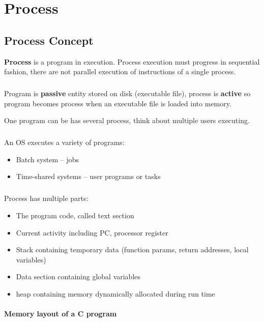 \chapter{Process}

\section{Process Concept}

\textbf{Process} is a program in execution. Process execution must progress in sequential fashion, there are not parallel execution of instructions of a single process. 
\paragraph{}
Program is \textbf{passive} entity stored on disk (executable file), process is \textbf{active} so program becomes process when an executable file is loaded into memory.

One program can be has several process, think about multiple users executing.

\paragraph{}
An OS executes a variety of programs:
\begin{itemize}
    \item Batch system – jobs
    \item Time-shared systems – user programs or tasks
\end{itemize}

\paragraph{}
Process has multiple parts:
\begin{itemize}
    \item The program code, called text section
    \item Current activity including PC, processor register
    \item Stack containing temporary data (function params, return addresses, local variables)
    \item Data section containing global variables
    \item heap containing memory dynamically allocated during run time
\end{itemize}

\subsubsection{Memory layout of a C program}

